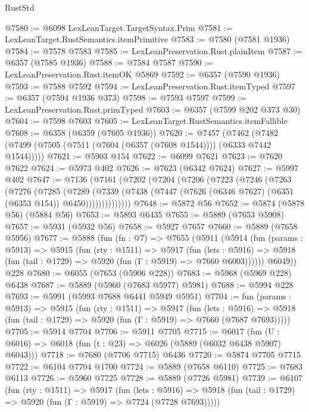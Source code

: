 \begin{lexlean}{RustStd}
\begin{coremodule}
@7580 := @6098 LexLeanTarget.TargetSyntax.Prim
@7581 := LexLeanTarget.RustSemantics.itemPrimitive
@7583 := @7580 (@7581 @1936)
@7584 := @7578 @7583
@7585 := LexLeanPreservation.Rust.plainItem
@7587 := @6357 (@7585 @1936)
@7588 := @7584 @7587
@7590 := LexLeanPreservation.Rust.itemOK @5869
@7592 := @6357 (@7590 @1936)
@7593 := @7588 @7592
@7594 := LexLeanPreservation.Rust.itemTyped
@7597 := @6357 (@7594 @1936 @373)
@7598 := @7593 @7597
@7599 := LexLeanPreservation.Rust.primTyped
@7603 := @6357 (@7599 @202 @373 @30)
@7604 := @7598 @7603
@7605 := LexLeanTarget.RustSemantics.itemFallible
@7608 := @6358 (@6359 (@7605 @1936))
@7620 := @7457
    (@7462 (@7482 (@7499 (@7505 (@7511 (@7604 (@6357 (@7608 @1544)))) (@6333 @7442 @1544)))))
@7621 := @5903 @154
@7622 := @6099 @7621
@7623 := @7620 @7622
@7624 := @5973 @402
@7626 := @7623 (@6342 @7624)
@7627 := @5997 @402
@7647 := @7136
    (@7161
      (@7202
        (@7204
          (@7206
            (@7223
              (@7246
                (@7263
                  (@7276
                    (@7285
                      (@7289
                        (@7339
                          (@7438
                            (@7447 (@7626 (@6346 @7627) (@6351 (@6353 @154)) @6450))))))))))))))
@7648 := @5872 @56
@7652 := @5874 (@5878 @56) (@5884 @56)
@7653 := @5893 @6435
@7655 := @5889 (@7653 @5908)
@7657 := @5931 (@5932 @56)
@7658 := @5927 @7657
@7660 := @5889 (@7658 @5956)
@7677 := @5888
    (fun (fn : @7) =>
    @7655
      (@5911
        (@5914
          (fun (params : @5913) =>
          @5915
            (fun (rty : @1511) =>
            @5917
              (fun (lets : @5916) =>
              @5918 (fun (tail : @1729) => @5920 (fun (Γ : @5919) => @7660 @6003))))))
        @6049))
    @228
@7680 := @6055 (@7653 (@5906 @228))
@7683 := @5968 (@5969 @228) @6438
@7687 := @5889 (@5960 (@7683 @5977) @5981)
@7688 := @5994 @228
@7693 := @5991 (@5993 @7688 @6441 @5949 @5951)
@7704 := fun (params : @5913) =>
  @5915
    (fun (rty : @1511) =>
    @5917
      (fun (lets : @5916) =>
      @5918 (fun (tail : @1729) => @5920 (fun (Γ : @5919) => @7660 (@7687 @7693)))))
@7705 := @5914 @7704
@7706 := @5911 @7705
@7715 := @6017 (fun (U : @6016) => @6018 (fun (t : @23) => @6026 (@5889 (@6032 @6438 @5907) @6043)))
@7718 := @7680 (@7706 @7715) @6436
@7720 := @5874 @7705 @7715
@7722 := @6104 @7704 @1700
@7724 := @5889 (@7658 @6110)
@7725 := @7683 @6113
@7726 := @5960 @7725
@7728 := @5889 (@7726 @5981)
@7739 := @6107
    (fun (rty : @1511) =>
    @5917
      (fun (lets : @5916) =>
      @5918 (fun (tail : @1729) => @5920 (fun (Γ : @5919) => @7724 (@7728 @7693)))))

\end{coremodule}
\end{lexlean}
